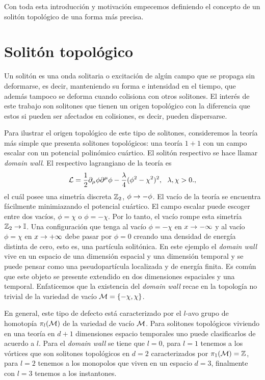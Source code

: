 Con toda esta introducción y motivación empecemos definiendo el concepto de un solitón topológico de una forma más precisa.


\section{Solitón topológico}

Un solitón es una onda solitaria o excitación de algún campo que se propaga sin deformarse, es decir, manteniendo su forma e intensidad en el tiempo, que además tampoco se deforma cuando colisiona con otros solitones. El interés de este trabajo son solitones que tienen un origen topológico con la diferencia que estos si pueden ser afectados en colisiones, es decir, pueden dispersarse.

Para ilustrar el origen topológico de este tipo de solitones, consideremos la teoría más simple que presenta solitones topológicos: una teoría $1+1$ con un campo escalar con un potencial polinómico cuártico. El solitón respectivo se hace llamar \emph{domain wall}. El respectivo lagrangiano de la teoría es
\begin{align}
	\mc L = \f 12\pr_\mu\phi\pr^\mu\phi-\f{\lambda}4(\phi^2-\chi^2)^2, \ \ \lambda,\chi>0.,
\end{align}
el cuál posee una simetría discreta $\mathbb{Z}_2$, $\phi\rightarrow-\phi$. El vacío de la teoría se encuentra fácilmente minimiazando el potencial cuártico. El campo escalar puede escoger entre dos vacíos, $\phi=\chi$ o $\phi=-\chi$. Por lo tanto, el vacío rompe esta simetría $\mathbb{Z}_2\rightarrow\mathbb{I}$. Una configuración que tenga al vacío $\phi=-\chi$ en $x\rightarrow-\infty$ y al vacío $\phi=\chi$ en $x\rightarrow+\infty$ debe pasar por $\phi=0$ creando una densidad de energía distinta de cero, esto es, una partícula solitónica. En este ejemplo el \emph{domain wall} vive en un espacio de una dimensión espacial y una dimensión temporal y se puede pensar como una pseudopartícula localizada y de energía finita. Es común que este objeto se presente extendido en dos dimensiones espaciales y una temporal. Enfaticemos que la existencia del \emph{domain wall} recae en la topología no trivial de la variedad de vacío $\mathcal{M}=\{-\chi,\chi\}$.

En general, este tipo de defecto está caracterizado por el $l$-avo grupo de homotopía $\pi_l(\mathcal{M})$ de la variedad de vacío $\mathcal{M}$. Para solitones topológicos viviendo en una teoría en $d+1$ dimensiones espacio temporales uno puede clasificarlos de acuerdo a $l$. Para el \emph{domain wall} se tiene que $l=0$, para $l=1$ tenemos a los vórtices que son solitones topológicos en $d=2$ caracterizados por $\pi_1(\mathcal{M})=\mathbb{Z}$, para $l=2$ tenemos a los monopolos que viven en un espacio $d=3$, finalmente con $l=3$ tenemos a los instantones.

